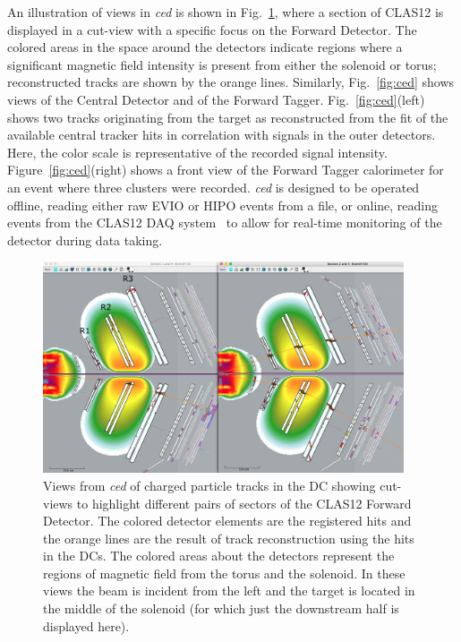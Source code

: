 An illustration of views in {\it ced} is shown in Fig.~\ref{fig:dcTracks}, where a section of CLAS12 is displayed in
a cut-view with a specific focus on the Forward Detector. The colored areas in the space around the detectors
indicate regions where a significant magnetic field intensity is present from either the solenoid or torus;
reconstructed tracks are shown by the orange lines. Similarly, Fig.~\ref{fig:ced} shows views of the Central
Detector and of the Forward Tagger. Fig.~\ref{fig:ced}(left) shows two tracks originating from the target as
reconstructed from the fit of the available central tracker hits in correlation with signals in the outer detectors.
Here, the color scale is representative of the recorded signal intensity. Figure~\ref{fig:ced}(right) shows a
front view of the Forward Tagger calorimeter for an event where three clusters were recorded. {\it ced} is
designed to be operated offline, reading either raw EVIO or HIPO events from a file, or online, reading events
from the CLAS12 DAQ system~\cite{daq-nim} to allow for real-time monitoring of the detector during data taking.

\begin{figure}
\centering
\includegraphics[width=0.95\textwidth]{pics/dcTrack3.png}
\caption{Views from {\it ced} of charged particle tracks in the DC showing cut-views to highlight different pairs
  of sectors of the CLAS12 Forward Detector. The colored detector elements are the registered hits and the
  orange lines are the result of track reconstruction using the hits in the DCs. The colored areas about the
  detectors represent the regions of magnetic field from the torus and the solenoid. In these views the beam is
  incident from the left and the target is located in the middle of the solenoid (for which just the downstream half
  is displayed here).}
\label{fig:dcTracks}
\end{figure}

